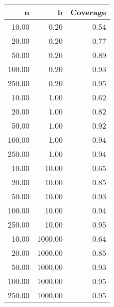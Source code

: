 
\begin{tabular}{rrr}
  \hline
n & b & Coverage \\ 
  \hline
10.00 & 0.20 & 0.54 \\ 
  20.00 & 0.20 & 0.77 \\ 
  50.00 & 0.20 & 0.89 \\ 
  100.00 & 0.20 & 0.93 \\ 
  250.00 & 0.20 & 0.95 \\ 
  10.00 & 1.00 & 0.62 \\ 
  20.00 & 1.00 & 0.82 \\ 
  50.00 & 1.00 & 0.92 \\ 
  100.00 & 1.00 & 0.94 \\ 
  250.00 & 1.00 & 0.94 \\ 
  10.00 & 10.00 & 0.65 \\ 
  20.00 & 10.00 & 0.85 \\ 
  50.00 & 10.00 & 0.93 \\ 
  100.00 & 10.00 & 0.94 \\ 
  250.00 & 10.00 & 0.95 \\ 
  10.00 & 1000.00 & 0.64 \\ 
  20.00 & 1000.00 & 0.85 \\ 
  50.00 & 1000.00 & 0.93 \\ 
  100.00 & 1000.00 & 0.95 \\ 
  250.00 & 1000.00 & 0.95 \\ 
   \hline
\end{tabular}
